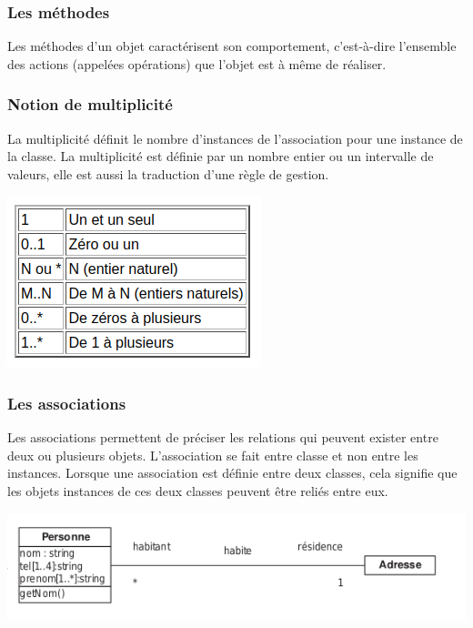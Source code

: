 			\subsubsection{Les méthodes}
				Les méthodes d'un objet caractérisent son comportement, c'est-à-dire l'ensemble des actions (appelées opérations) que l'objet est à même de réaliser.
			\subsubsection{Notion de multiplicité}
				La multiplicité définit le nombre d'instances de l'association pour une instance de la classe\cite{}.
				La multiplicité est définie par un nombre entier ou un intervalle de valeurs, elle est aussi la traduction d'une règle de gestion.
				\begin{center}
					\includegraphics{images/img-2.png}
					\label{figure2}
				\end{center}
			\subsubsection{Les associations}
			Les associations permettent de préciser les relations qui peuvent exister entre deux ou plusieurs objets.
			L'association se fait entre classe et non entre les instances. Lorsque une association est
			définie entre deux classes, cela signifie que les objets instances de ces deux classes
			peuvent être reliés entre eux.
			\begin{center}
				\includegraphics[width=\columnwidth]{images/assoc-1.png}
				\label{figure3}
			\end{center}

